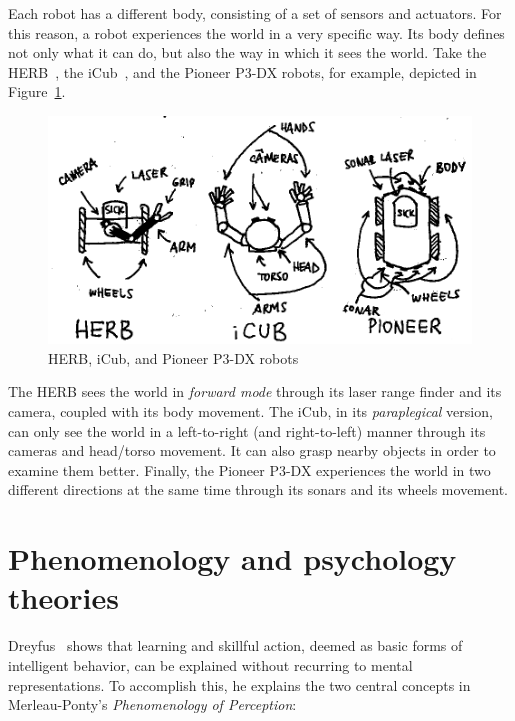\documentclass{article}
\begin{document}
Each robot has a different body, consisting of a set of sensors and actuators. 
For this reason, a robot experiences the world in a very specific way. Its body
defines not only what it can do, but also the way in which it sees the world.
Take the HERB~\cite{srinivasa2009herb}, the iCub~\cite{metta2010icub}, and the
Pioneer P3-DX robots, for example, depicted in
Figure~\ref{fig:herb_icub_pioneer}.

\begin{figure}[h]
  \centering
  \includegraphics{figures/herb_icub_pioneer.png}
  \caption{HERB, iCub, and Pioneer P3-DX robots}
  \label{fig:herb_icub_pioneer}
\end{figure}

The HERB sees the world in \emph{forward mode} through its laser range finder
and its camera, coupled with its body movement. The iCub, in its
\emph{paraplegical} version, can only see the world in a left-to-right (and
right-to-left) manner through its cameras and head/torso movement. It can also
grasp nearby objects in order to examine them better. Finally, the Pioneer P3-DX
experiences the world in two different directions at the same time through its
sonars and its wheels movement. 


\section{Phenomenology and psychology theories}


Dreyfus~\cite{dreyfus2002} shows that learning and skillful action, deemed as
basic forms of intelligent behavior, can be explained without recurring to
mental representations. To accomplish this, he explains the two central concepts
in Merleau-Ponty's \emph{Phenomenology of Perception}:
\end{document}
